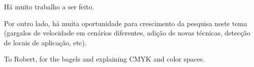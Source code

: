 \documentclass[sigconf]{acmart}
\begin{document}
Há muito trabalho a ser feito.

Por outro lado, há muita oportunidade para crescimento da pesquisa neste tema (gargalos de velocidade em cenários diferentes, adição de novas técnicas, detecção de locais de aplicação, etc).

\begin{acks}
To Robert, for the bagels and explaining CMYK and color spaces.
\end{acks}



\end{document}
